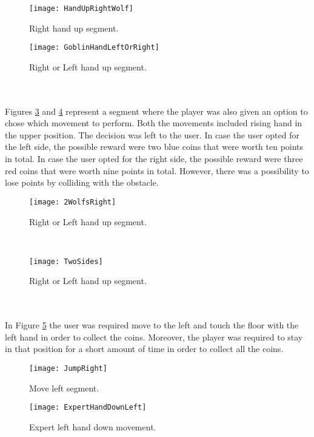 \begin{figure}[h]
    \centering
    \texttt{[image: HandUpRightWolf]}
    \caption{Right hand up segment.}
    \label{fig:wolfRight}
\end{figure}
\begin{figure}[h]
    \centering
    \texttt{[image: GoblinHandLeftOrRight]}
    \caption{Right or Left hand up segment.}
    \label{fig:goblin}
\end{figure}\\\\
Figures \ref{fig:2wolfs} and \ref{fig:2sides} represent a segment where the player was also given an option to chose which movement to perform. Both the movements included rising hand in the upper position. The decision was left to the user. In case the user opted for the left side, the possible reward were two blue coins that were worth ten points in total. In case the user opted for the right side, the possible reward were three red coins that were worth nine points in total. However, there was a possibility to lose points by colliding with the obstacle.\\
\begin{figure}[h]
    \centering
    \texttt{[image: 2WolfsRight]}
    \caption{Right or Left hand up segment.}
    \label{fig:2wolfs}
\end{figure}\\
\begin{figure}[h]
    \centering
    \texttt{[image: TwoSides]}
    \caption{Right or Left hand up segment.}
    \label{fig:2sides}
\end{figure}\\\\
In Figure \ref{fig:jumpleft} the user was required move to the left and touch the floor with the left hand in order to collect the coins. Moreover, the player was required to stay in that position for a short amount of time in order to collect all the coins.\\
\begin{figure}[h]
    \centering
    \texttt{[image: JumpRight]}
    \caption{Move left segment.}
    \label{fig:jumpleft}
\end{figure}
\begin{figure}[h]
    \centering
    \texttt{[image: ExpertHandDownLeft]}
    \caption{Expert left hand down movement.}
    \label{fig:expertLeftDown}
\end{figure}\\
